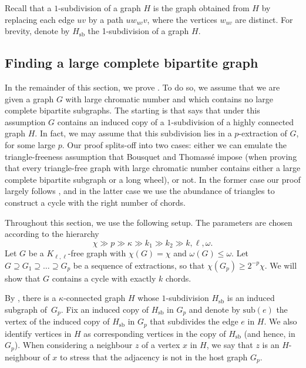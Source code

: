 \documentclass[11pt,english]{article}
\theoremstyle{plain}
\theoremstyle{definition}
\theoremstyle{remark}
\newcommand{\sub}{\mathrm{sub}}
\newcommand{\sbb}{\mathrm{sb}}
\begin{document}
	Recall that a $1$-subdivision of a graph $H$ is the graph obtained from $H$ by replacing each edge $uv$ by a path $uw_{uv}v$, where the vertices $w_{uv}$ are distinct. 
	For brevity, denote by $H_\sbb$ the 1-subdivision of a graph $H$. 
  
	\subsection{Finding a large complete bipartite graph}
	
	In the remainder of this section, we prove .
	To do so, we assume that we are given a graph $G$ with large chromatic number and which contains no large complete bipartite subgraphs. The starting is  that says that under this assumption $G$ contains an induced copy of a $1$-subdivision of a highly connected graph $H$. In fact, we may assume that this subdivision lies in a $p$-extraction of $G$, for some large $p$. Our proof splits-off into two cases: either we can emulate the triangle-freeness assumption that Bousquet and Thomass\'e \cite{bousquet-thomasse} impose (when proving that every triangle-free graph with large chromatic number contains either a large complete bipartite subgraph or a long wheel), or not. In the former case our proof largely follows \cite{bousquet-thomasse}, and in the latter case we use the abundance of triangles to construct a cycle with the right number of chords.
	
	Throughout this section, we use the following setup. The parameters are chosen according to the hierarchy
    \begin{equation*}
        \chi \gg p \gg \kappa \gg k_1 \gg k_2 \gg k, \ell, \omega. 
    \end{equation*}
    Let $G$ be a $K_{\ell,\ell}$-free graph with $\chi(G) = \chi$ and $\omega(G) \le \omega$.
    Let $G \supseteq G_1 \supseteq \ldots \supseteq G_p$ be a sequence of extractions, so that $\chi(G_p) \ge 2^{-p}\chi$. We will show that $G$ contains a cycle with exactly $k$ chords. 
    
	  
    By , there is a $\kappa$-connected graph $H$ whose $1$-subdivision $H_\sbb$ is an induced subgraph of~$G_p$. Fix an induced copy of $H_\sbb$ in $G_p$ and denote by $\sub(e)$ the vertex of the induced copy of $H_\sbb$ in $G_p$ that subdivides the edge $e$ in $H$. We also identify vertices in $H$ as corresponding vertices in the copy of $H_\sbb$ (and hence, in $G_p$). When considering a neighbour $z$ of a vertex $x$ in $H$, we say that $z$ is an $H$-neighbour of $x$ to stress that the adjacency is not in the host graph $G_p$.
    
\end{document}
